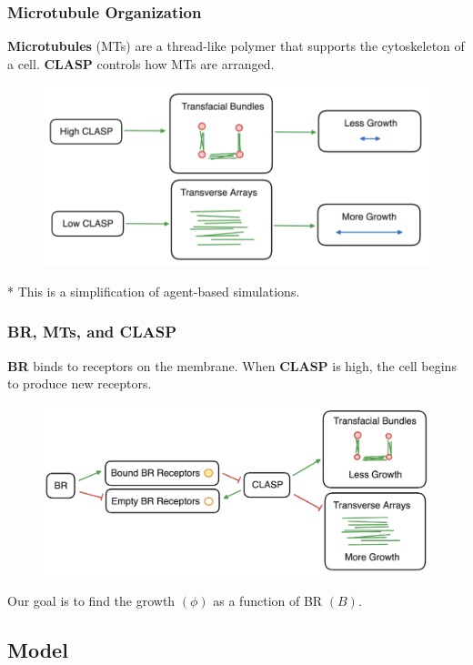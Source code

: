 \documentclass{beamer}
\begin{document}
\begin{frame}
\frametitle{Microtubule Organization}

\textbf{Microtubules} (MTs) are a thread-like polymer that supports the cytoskeleton of a cell. \textbf{CLASP} controls how MTs are arranged.

\begin{figure}
	\centering
	\includegraphics[scale = 0.5]{fig1.png}
\end{figure}

* This is a simplification of agent-based simulations.

\end{frame}


\begin{frame}
\frametitle{BR, MTs, and CLASP}
\textbf{BR} binds to receptors on the membrane. When \textbf{CLASP} is high, the cell begins to produce new receptors.

\begin{figure}
	\centering
	\includegraphics[scale = 0.27]{fig2.png}
\end{figure}

Our goal is to find the growth $(\phi)$ as a function of BR $(B)$. 

\end{frame}



\subsection{Model} 
\end{document}
